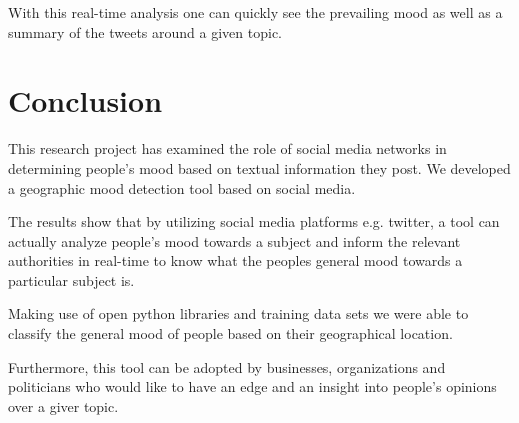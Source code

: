 With this real-time analysis one can quickly see the prevailing mood as well as a summary of the tweets around a given topic.





\chapter{Conclusion}

This research project has examined the role of social media networks in determining people's mood based on textual information they post. We developed a geographic mood detection tool based on social media.

The results show that by utilizing social media platforms e.g. twitter, a tool can actually analyze people's mood towards a subject and inform the relevant authorities in real-time to know what the people\textquotesingle s general mood towards a particular subject is.

Making use of open python libraries and training data sets we were able to classify the general mood 
of people based on their geographical location.

Furthermore, this tool can be adopted by businesses, organizations and politicians who would like to have an edge and an insight into people's opinions over a giver topic.



